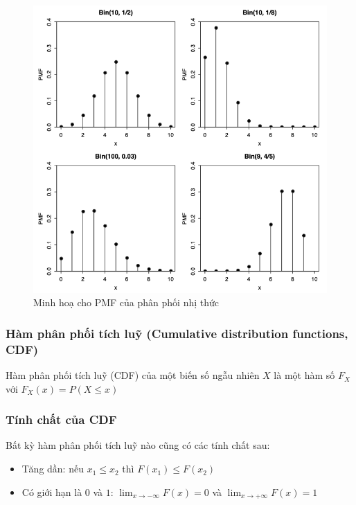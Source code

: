 \documentclass[
]{book}
\providecommand{\tightlist}{%
  \setlength{\itemsep}{0pt}\setlength{\parskip}{0pt}}
\begin{document}
\begin{figure}
\includegraphics[width=10.19in]{figures/Picture09} \caption{Minh hoạ cho PMF của phân phối nhị thức}\label{fig:unnamed-chunk-5}
\end{figure}

\hypertarget{huxe0m-phuxe2n-phux1ed1i-tuxedch-luux1ef9-cumulative-distribution-functions-cdf}{%
\subsubsection{Hàm phân phối tích luỹ (Cumulative distribution functions, CDF)}\label{huxe0m-phuxe2n-phux1ed1i-tuxedch-luux1ef9-cumulative-distribution-functions-cdf}}

Hàm phân phối tích luỹ (CDF) của một biến số ngẫu nhiên \(X\) là một hàm số \(F_X\) với \(F_X(x) = P(X \leq x)\)

\hypertarget{tuxednh-chux1ea5t-cux1ee7a-cdf}{%
\subsubsection{Tính chất của CDF}\label{tuxednh-chux1ea5t-cux1ee7a-cdf}}

Bất kỳ hàm phân phối tích luỹ nào cũng có các tính chất sau:

\begin{itemize}
\tightlist
\item
  Tăng dần: nếu \(x_1 \leq x_2\) thì \(F(x_1) \leq F(x_2)\)
\item
  Có giới hạn là \(0\) và \(1\): \(\lim_{x\rightarrow -\infty}F(x) = 0\) và \(\lim_{x\rightarrow +\infty}F(x) = 1\)
\end{itemize}
\end{document}

